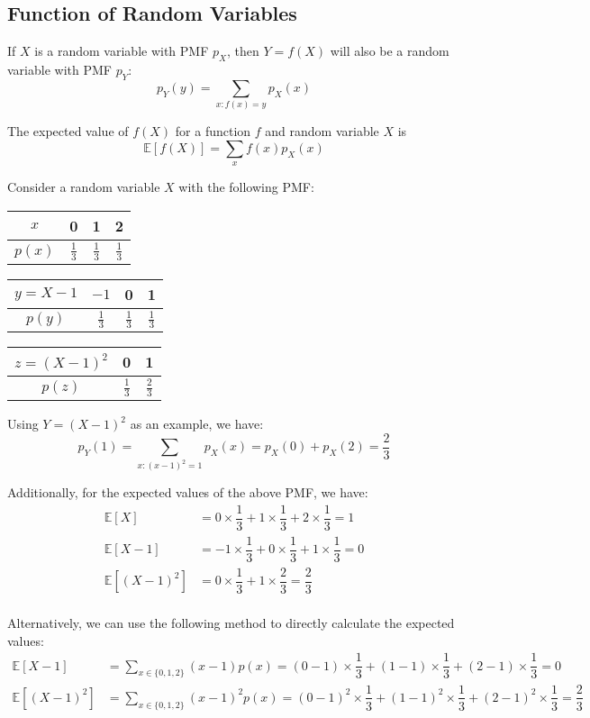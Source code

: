 \subsection{Function of Random Variables}
If \(X\) is a random variable with PMF \(p_X\), then \(Y = f(X)\) will also be a random variable with PMF \(p_Y\):
\[
  p_Y(y) = \sum_{x: f(x)=y} p_X(x)
\]

The expected value of \(f(X)\) for a function \(f\) and random variable \(X\) is 
\[
  \mathbb{E}[f(X)] = \sum_{x} f(x)p_X(x) 
\]

\begin{eg}
Consider a random variable \(X\) with the following PMF: 
\begin{center}
\begin{tabular}{c|c|c|c}
      \toprule
      \(x\)  & 0 & 1 & 2  \\
    \midrule
      \(p(x)\)  & \(\frac{1}{3}\) & \(\frac{1}{3}\) & \(\frac{1}{3}\)  \\
      \bottomrule
  \end{tabular}
  \quad\quad
  \begin{tabular}{c|c|c|c}
      \toprule
      \(y = X - 1\)  & \(-1\)  & 0 & 1  \\
    \midrule
      \(p(y)\)  & \(\frac{1}{3}\) & \(\frac{1}{3}\) & \(\frac{1}{3}\)  \\
      \bottomrule
\end{tabular}
\quad\quad
\begin{tabular}{c|c|c}
  \toprule
  \(z = (X - 1)^2\)  & 0 & 1  \\
\midrule
  \(p(z)\)  & \(\frac{1}{3}\) & \(\frac{2}{3}\)  \\
  \bottomrule
\end{tabular}
\end{center}

Using \(Y = (X - 1)^2\) as an example, we have: 
\[
  p_Y(1) = \sum_{x: (x - 1)^2=1} p_X(x) = p_X(0) + p_X(2) = \dfrac{2}{3}
\]

Additionally, for the expected values of the above PMF, we have: 
\[
\begin{aligned}
  \mathbb{E}[X] &= 0 \times \dfrac{1}{3} + 1 \times \dfrac{1}{3} + 2 \times \dfrac{1}{3} = 1 \\
  \mathbb{E}[X - 1] &= -1 \times \dfrac{1}{3} + 0 \times \dfrac{1}{3} + 1 \times \dfrac{1}{3} = 0 \\
  \mathbb{E}[(X - 1)^2] &= 0 \times \dfrac{1}{3} + 1 \times \dfrac{2}{3} = \dfrac{2}{3} \\
\end{aligned}
\]

Alternatively, we can use the following method to directly calculate the expected values:
\[
\begin{aligned}
  \mathbb{E}[X - 1] &= \sum_{x \in \{0, 1, 2\}}(x - 1)p(x) = (0 - 1) \times \dfrac{1}{3} + (1 - 1) \times \dfrac{1}{3} + (2 - 1) \times \dfrac{1}{3} = 0 \\
  \mathbb{E}[(X - 1)^2] &= \sum_{x \in \{0, 1, 2\}}(x - 1)^2 p(x) = (0 - 1)^2 \times \dfrac{1}{3} + (1 - 1)^2 \times \dfrac{1}{3} + (2 - 1)^2 \times \dfrac{1}{3} = \dfrac{2}{3}
\end{aligned}
\]

\end{eg}

